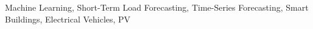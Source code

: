 \noindent Machine Learning, Short-Term Load Forecasting, Time-Series Forecasting, Smart Buildings, Electrical Vehicles, PV